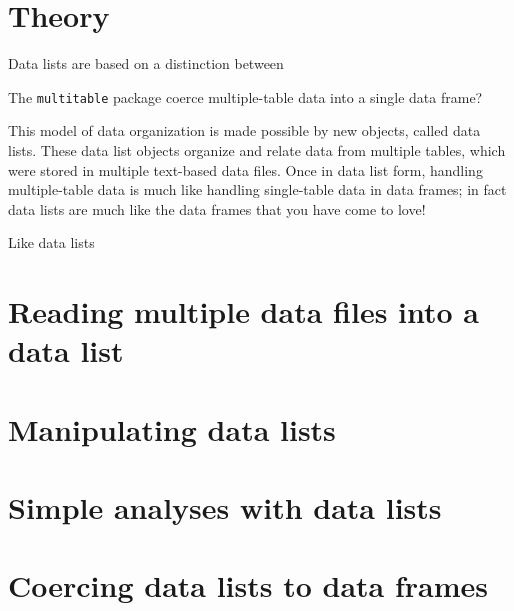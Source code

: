 \documentclass{article}
\newcommand{\code}[1]{\texttt{#1}}
\numberwithin{exercise}{section}
\begin{document}

\section{Theory}

Data lists are based on a distinction between 

The \code{multitable} package  coerce multiple-table data into a single data frame?  

This model of data organization is made possible by new objects, called data lists.  These data list objects organize and relate data from multiple tables, which were stored in multiple text-based data files.  Once in data list form, handling multiple-table data is much like handling single-table data in data frames; in fact data lists are much like the data frames that you have come to love!

Like data lists 





\section{Reading multiple data files into a data list}
\section{Manipulating data lists}
\section{Simple analyses with data lists}
\section{Coercing data lists to data frames}
\end{document}
